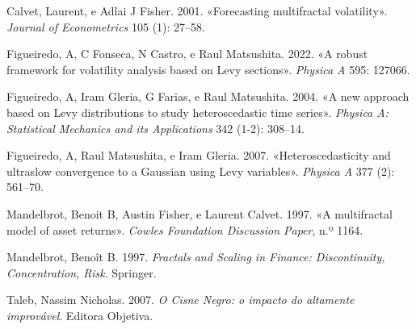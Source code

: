 \documentclass[
  letterpaper,
  DIV=11,
  numbers=noendperiod]{scrartcl}
\newlength{\cslhangindent}
\newenvironment{CSLReferences}[2] %
 {\begin{list}{}{%
  \setlength{\itemindent}{0pt}
  \setlength{\leftmargin}{0pt}
  \setlength{\parsep}{0pt}
  \ifodd #1
   \setlength{\leftmargin}{\cslhangindent}
   \setlength{\itemindent}{-1\cslhangindent}
  \fi
  \setlength{\itemsep}{#2\baselineskip}}}
 {\end{list}}
\begin{document}
\label{refs}
\begin{CSLReferences}{1}{0}
Calvet, Laurent, e Adlai J Fisher. 2001. {«Forecasting multifractal
volatility»}. \emph{Journal of Econometrics} 105 (1): 27--58.

Figueiredo, A, C Fonseca, N Castro, e Raul Matsushita. 2022. {«A robust
framework for volatility analysis based on Levy sections»}.
\emph{Physica A} 595: 127066.

Figueiredo, A, Iram Gleria, G Farias, e Raul Matsushita. 2004. {«A new
approach based on Levy distributions to study heteroscedastic time
series»}. \emph{Physica A: Statistical Mechanics and its Applications}
342 (1-2): 308--14.

Figueiredo, A, Raul Matsushita, e Iram Gleria. 2007.
{«Heteroscedasticity and ultraslow convergence to a Gaussian using Levy
variables»}. \emph{Physica A} 377 (2): 561--70.

Mandelbrot, Benoit B, Austin Fisher, e Laurent Calvet. 1997. {«A
multifractal model of asset returns»}. \emph{Cowles Foundation
Discussion Paper}, n.º 1164.

Mandelbrot, Benoît B. 1997. \emph{Fractals and Scaling in Finance:
Discontinuity, Concentration, Risk}. Springer.

Taleb, Nassim Nicholas. 2007. \emph{O Cisne Negro: o impacto do
altamente improvável}. Editora Objetiva.

\end{CSLReferences}
\end{document}

